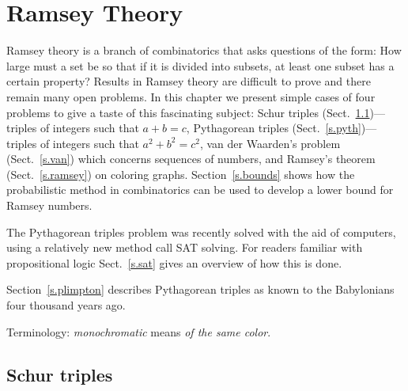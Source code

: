 
\chapter{Ramsey Theory}\label{c.ramsey}



Ramsey theory is a branch of combinatorics that asks questions of the form: How large must a set be so that if it is divided into subsets, at least one subset has a certain property?
Results in Ramsey theory are difficult to prove and there remain many open problems. In this chapter we present simple cases of four problems to give a taste of this fascinating subject: Schur triples (Sect.~\ref{s.schur})---triples of integers such that $a+b=c$, Pythagorean triples (Sect.~\ref{s.pyth})---triples of integers such that $a^2+b^2=c^2$, van der Waarden's problem (Sect.~\ref{s.van}) which concerns sequences of numbers, and Ramsey's theorem (Sect.~\ref{s.ramsey}) on coloring graphs. Section~\ref{s.bounds} shows how the probabilistic method in combinatorics can be used to develop a lower bound for Ramsey numbers.

The Pythagorean triples problem was recently solved with the aid of computers, using a relatively new method call SAT solving. For readers familiar with propositional logic Sect.~\ref{s.sat} gives an overview of how this is done.

Section~\ref{s.plimpton} describes Pythagorean triples as known to the Babylonians four thousand years ago.

Terminology: \emph{monochromatic} means \emph{of the same color}.

\vspace{-3ex}

\section{Schur triples}\label{s.schur}

